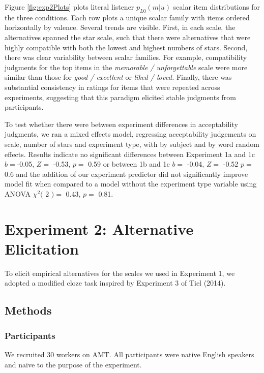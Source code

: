 \documentclass[10pt, letterpaper]{article}
\begin{document}
Figure \ref{fig:exp2Plots} plots literal listener \(p_{L0}(m|u)\) scalar
item distributions for the three conditions. Each row plots a unique
scalar family with items ordered horizontally by valence. Several trends
are visible. First, in each scale, the alternatives spanned the star
scale, such that there were alternatives that were highly compatible
with both the lowest and highest numbers of stars. Second, there was
clear variability between scalar families. For example, compatibility
judgments for the top items in the \emph{memorable / unforgettable}
scale were more similar than those for \emph{good / excellent} or
\emph{liked / loved.} Finally, there was substantial consistency in
ratings for items that were repeated across experiments, suggesting that
this paradigm elicited stable judgments from participants.

To test whether there were between experiment differences in
acceptability judgments, we ran a mixed effects model, regressing
acceptability judgements on scale, number of stars and experiment type,
with by subject and by word random effects. Results indicate no
significant differences between Experiment 1a and 1c \(b =\)-0.05,
\(Z =\) -0.53, \(p =\) 0.59 or between 1b and 1c \(b =\) -0.04, \(Z =\)
-0.52 \(p =\) 0.6 and the addition of our experiment predictor did not
significantly improve model fit when compared to a model without the
experiment type variable using ANOVA \(\chi^2(\) 2 \() =\) 0.43, \(p =\)
0.81.

\section{Experiment 2: Alternative
Elicitation}\label{experiment-2-alternative-elicitation}

To elicit empirical alternatives for the scales we used in Experiment 1,
we adopted a modified cloze task inspired by Experiment 3 of Tiel
(2014).

\subsection{Methods}\label{methods-1}

\subsubsection{Participants}\label{participants-1}

We recruited 30 workers on AMT. All participants were native English
speakers and naive to the purpose of the experiment.
\end{document}
